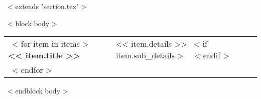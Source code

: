 ~< extends "section.tex" >~

~< block body >~
\begin{tabular}{p{1in}p{6in}}
  ~< for item in items >~
    \textbf{<< item.title >>} & << item.details >>
    ~< if item.sub_details >~
    \scriptsize{
      \color{gray}{<< item.sub_details >>}
    }
    ~< endif >~ \\
  ~< endfor >~
\end{tabular}
~< endblock body >~
